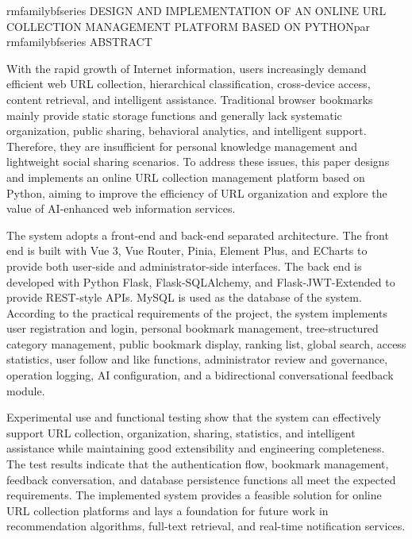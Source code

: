 \documentclass[12pt,a4paper]{ctexart}
\begin{document}
\clearpage
\pagestyle{fancy}
\fancyhf{}
\cfoot{\thepage}
\begin{center}
    {rmfamilybfseries DESIGN AND IMPLEMENTATION OF AN ONLINE URL COLLECTION MANAGEMENT PLATFORM BASED ON PYTHONpar}
    \vspace{0.6cm}
    {rmfamilybfseries ABSTRACT}
\end{center}

{\rmfamily
With the rapid growth of Internet information, users increasingly demand efficient web URL collection, hierarchical classification, cross-device access, content retrieval, and intelligent assistance. Traditional browser bookmarks mainly provide static storage functions and generally lack systematic organization, public sharing, behavioral analytics, and intelligent support. Therefore, they are insufficient for personal knowledge management and lightweight social sharing scenarios. To address these issues, this paper designs and implements an online URL collection management platform based on Python, aiming to improve the efficiency of URL organization and explore the value of AI-enhanced web information services.

The system adopts a front-end and back-end separated architecture. The front end is built with Vue 3, Vue Router, Pinia, Element Plus, and ECharts to provide both user-side and administrator-side interfaces. The back end is developed with Python Flask, Flask-SQLAlchemy, and Flask-JWT-Extended to provide REST-style APIs. MySQL is used as the database of the system. According to the practical requirements of the project, the system implements user registration and login, personal bookmark management, tree-structured category management, public bookmark display, ranking list, global search, access statistics, user follow and like functions, administrator review and governance, operation logging, AI configuration, and a bidirectional conversational feedback module.

Experimental use and functional testing show that the system can effectively support URL collection, organization, sharing, statistics, and intelligent assistance while maintaining good extensibility and engineering completeness. The test results indicate that the authentication flow, bookmark management, feedback conversation, and database persistence functions all meet the expected requirements. The implemented system provides a feasible solution for online URL collection platforms and lays a foundation for future work in recommendation algorithms, full-text retrieval, and real-time notification services.

\vspace{0.8cm}
}
\end{document}
